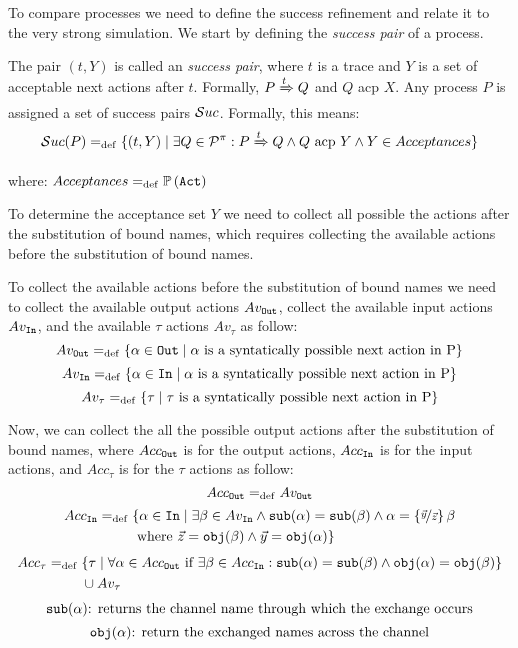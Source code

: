 To compare \picalc{} processes we need to define the success refinement and relate it to the very strong simulation. We start by defining the \textit{success pair} of a process.

The pair $(t, Y)$ is called an \textit{success pair}, where $t$ is a trace and $Y$ is a set of acceptable next actions after $t$. Formally, $P \xRightarrow{t} Q$ and $Q$ acp $X$. Any process
$P$ is assigned a set of success pairs $\Successes[]$. Formally, this means:
\begin{align}
    \Successes[P] \define \{(t,Y) \mid \exists Q\in\procs: P \bigstep{t} Q \wedge Q \text{ acp } Y \wedge Y\in Acceptances\}
\end{align}

where: $Acceptances =_{\mathrm{def}} \mathbb P\left(\mathtt{Act}\right)$

To determine the acceptance set $Y$ we need to collect all possible the actions after the substitution of bound names, which requires collecting the available actions before the substitution of bound names.

To collect the available actions before the substitution of bound names we need to collect the available output actions $Av_{\mathtt{Out}}$, collect the available input actions $Av_{\mathtt{In}}$, and the available $\tau$ actions $Av_\tau$ as follow:
\[Av_{\mathtt{Out}}=_{\mathrm{def}}\{ \alpha \in \mathtt{Out} \mid \alpha\text{ is a syntatically possible next action in P}\}\]
\[Av_{\mathtt{In}}=_{\mathrm{def}}\{ \alpha \in \mathtt{In} \mid \alpha\text{ is a syntatically possible next action in P}\}\]
\[Av_\tau=_{\mathrm{def}}\{ \tau \mid \tau\text{ is a syntatically possible next action in P}\}\]

Now, we can collect the all the possible output actions after the substitution of bound names, where $Acc_{\mathtt{Out}}$ is for the output actions, $Acc_{\mathtt{In}}$ is for the input actions, and $Acc_\tau$ is for the $\tau$ actions as follow:
\[Acc_{\mathtt{Out}} =_{\mathrm{def}} Av_{\mathtt{Out}}\]
\begin{equation*}
\begin{aligned}
Acc_{\mathtt{In}} =_{\mathrm{def}}{} & \{\alpha \in \mathtt{In} \mid \exists \beta \in Av_{\mathtt{In}} \wedge \mathtt{sub}(\alpha)=\mathtt{sub}(\beta) \wedge \alpha=\left\{\nicefrac{\vec{y}}{\vec{z}}\right\}\beta \\
      &  \text{ where } \vec{z}=\mathtt{obj}(\beta) \wedge \vec{y}=\mathtt{obj}(\alpha) \}
\end{aligned}
\end{equation*}
\begin{equation*}
\begin{aligned}
Acc_\tau =_{\mathrm{def}}{} & \{\tau \mid \forall \alpha \in Acc_{\mathtt{Out}} \text{ if } \exists \beta \in Acc_{\mathtt{In}}  :\mathtt{sub}(\alpha)=\mathtt{sub}(\beta) \wedge \mathtt{obj}(\alpha)=\mathtt{obj}(\beta)  \} \\
      &  \cup Av_\tau
\end{aligned}
\end{equation*}
\[\mathtt{sub}(\alpha) \text{: returns the channel name through which the exchange occurs}\]
\[\mathtt{obj}(\alpha) \text{: return the exchanged names across the channel}\]

